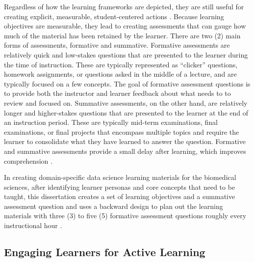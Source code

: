\documentclass[010-intro.tex]{subfiles}
\begin{document}
        Regardless of how the learning frameworks are depicted,
        they are still useful for creating explicit, measurable, student-centered actions
        \cite{wilson2019teaching, ambrose2010learning}.
        Because learning objectives are measurable, they lead to creating assessments that can gauge
        how much of the material has been retained by the learner.
        There are two (2) main forms of assessments, formative and summative.
        Formative assessments are relatively quick and low-stakes questions that are presented to the learner
        during the time of instruction.
        These are typically represented as ``clicker'' questions, homework assignments, or questions asked in the middle of a lecture,
        and are typically focused on a few concepts.
        The goal of formative assessment questions is to provide both the instructor and learner
        feedback about what needs to to review and focused on.
        Summative assessments, on the other hand, are relatively longer and higher-stakes questions that are presented
        to the learner at the end of an instruction period.
        These are typically mid-term examinations, final examinations, or final projects
        that encompass multiple topics and require the learner to consolidate what they have learned to answer the question.
        Formative and summative assessments provide a small delay after learning,
        which improves comprehension
        \cite{andersonWhyDelayedSummaries2008}.

        In creating domain-specific data science learning materials for the biomedical sciences,
        after identifying learner personas and core concepts that need to be taught,
        this dissertation creates a set of learning objectives and a summative assessment question
        and uses a backward design to plan out the learning materials with three (3) to five (5)
        formative assessment questions roughly every instructional hour
        \cite{wilson2019teaching}.


    \subsection{Engaging Learners for Active Learning}
    \label{se:intro-engaging}
\end{document}
